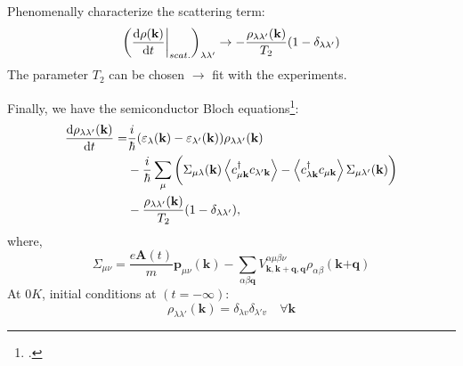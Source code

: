 \documentclass{beamer}
\begin{document}
\begin{frame}
\quad Phenomenally characterize the scattering term:
\begin{equation}
	\bigg(\dv{\rho(\textbf{k})}{t}\bigg|_{scat.}\bigg)_{\lambda\lambda'} \to - \frac{\rho_{\lambda\lambda'}(\textbf{k})}{T_2}(1-\delta_{\lambda\lambda'})
\end{equation}
\quad The parameter \(T_2\) can be chosen $\to$ fit with the experiments.
\end{frame}
\begin{frame}
Finally, we have the semiconductor Bloch equations\footcite{haug_quantum_2009}:
\begin{align}
	\dv{\rho_{\lambda\lambda'}(\textbf{k})}{t} = &\frac{i}{\hbar} (\varepsilon_{\lambda}(\textbf{k}) - \varepsilon_{\lambda'}(\textbf{k}))\rho_{\lambda\lambda'}(\textbf{k})\nonumber\\
	&-\frac{i}{\hbar} \sum_{\mu}\bigg(\Sigma_{\mu \lambda}(\textbf{k}) \ev{c^{\dagger}_{\mu\textbf{k}} c_{\lambda'\textbf{k}}} - \ev{c^{\dagger}_{\lambda\textbf{k}} c_{\mu\textbf{k}}} \Sigma_{\mu \lambda'}(\textbf{k})\bigg)\\ &-\frac{\rho_{\lambda\lambda'}(\textbf{k})}{T_2}(1-\delta_{\lambda\lambda'}),\nonumber
\end{align}
where,
\begin{equation}
	\Sigma_{\mu\nu} = \frac{e\textbf{A}(t)}{m}\textbf{p}_{\mu\nu}(\textbf{k}) - \sum_{\alpha\beta\textbf{q}} V^{\alpha \mu \beta \nu}_{\textbf{k},\textbf{k}+\textbf{q},\textbf{q}}\rho_{\alpha \beta}(\textbf{k+q})
\end{equation}
At $0K$, initial conditions at \((t=-\infty)\):
$$\rho_{\lambda\lambda'}(\textbf{k}) = \delta_{\lambda v} \delta_{\lambda' v} \quad \forall \textbf{k}$$
\end{frame}
\end{document}
